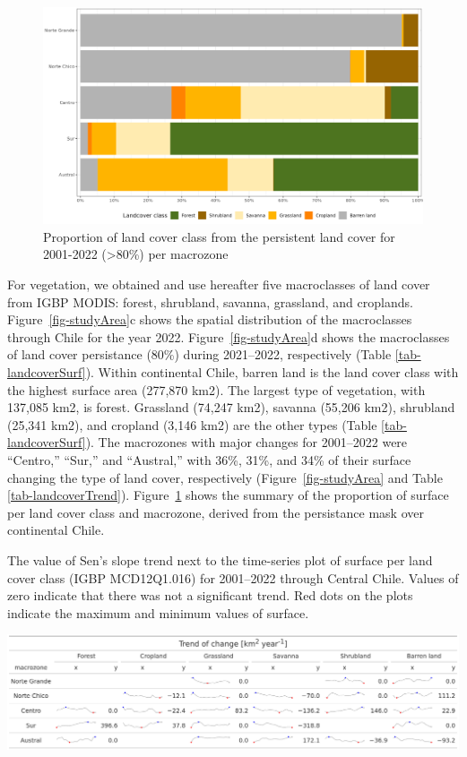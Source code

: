 \documentclass[
  authoryear,
  preprint,
  3p,
  onecolumn]{elsarticle}
\begin{document}
\begin{figure}[!ht]

{\centering \includegraphics{../output/figs/LC_pers80_per_macrozone.png}

}

\caption{\label{fig-LCprop}Proportion of land cover class from the
persistent land cover for 2001-2022 (\textgreater80\%) per macrozone}

\end{figure}

For vegetation, we obtained and use hereafter five macroclasses of land
cover from IGBP MODIS: forest, shrubland, savanna, grassland, and
croplands. Figure~\ref{fig-studyArea}c shows the spatial distribution of
the macroclasses through Chile for the year 2022.
Figure~\ref{fig-studyArea}d shows the macroclasses of land cover
persistance (80\%) during 2021--2022, respectively (Table
\ref{tab-landcoverSurf}). Within continental Chile, barren land is the
land cover class with the highest surface area (277,870 km2). The
largest type of vegetation, with 137,085 km2, is forest. Grassland
(74,247 km2), savanna (55,206 km2), shrubland (25,341 km2), and cropland
(3,146 km2) are the other types (Table \ref{tab-landcoverSurf}). The
macrozones with major changes for 2001--2022 were ``Centro,'' ``Sur,''
and ``Austral,'' with 36\%, 31\%, and 34\% of their surface changing the
type of land cover, respectively (Figure~\ref{fig-studyArea} and Table
\ref{tab-landcoverTrend}). Figure~\ref{fig-LCprop} shows the summary of
the proportion of surface per land cover class and macrozone, derived
from the persistance mask over continental Chile.

\begin{table}[!ht]
\caption{The value of Sen's slope trend next to the time-series plot of surface per land cover class (IGBP MCD12Q1.016) for 2001–2022 through Central Chile. Values of zero indicate that there was not a significant trend. Red dots on the plots indicate the maximum and minimum values of surface.}
\label{tab-landcoverTrend}
\includegraphics[]{../output/figs/table_var_landcover_macro.png}
\end{table}
\end{document}
